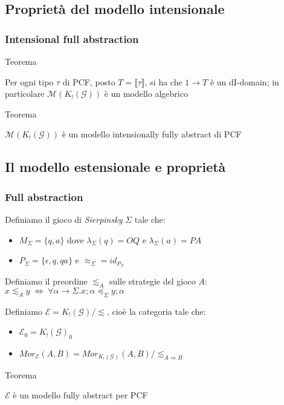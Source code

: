\documentclass{beamer}
\begin{document}
\subsection{Proprietà del modello intensionale}

\begin{frame}
	
	\frametitle{Intensional full abstraction}
	
	
	\begin{block}{Teorema}
		
		Per ogni tipo $\tau$ di PCF, posto $T= \llbracket \tau \rrbracket$, si ha che $1 \rightarrow T$ è un dI-domain;
		in particolare $\mathcal{M}(K_! (\mathcal{G}) )$ è un modello algebrico
		
	\end{block}
	
	
	\begin{block}{Teorema}
		
		$\mathcal{M}(K_! (\mathcal{G}) )$ è un modello intensionally fully abstract di PCF
		
	\end{block}
	
	
\end{frame}




\subsection{Il modello estensionale e proprietà}

\begin{frame}
	
	\frametitle{Full abstraction}
	
	Definiamo il gioco di \emph{Sierpinsky} $\Sigma$ tale che:
	\begin{itemize}
		\item $M_\Sigma = \{ q,a \}$ dove $\lambda_\Sigma (q)=OQ$ e $\lambda_\Sigma (a)=PA$
		\item $P_\Sigma = \{ \epsilon , q , qa \}$ e $\approx_\Sigma = id_{P_\Sigma}$
	\end{itemize}
	
	Definiamo il preordine $\lesssim_A$ sulle strategie del gioco $A$: $x \lesssim_A y \; \Leftrightarrow \; \forall \alpha \rightarrow \Sigma . x;\alpha \preccurlyeq_\Sigma y;\alpha$
	
	Definiamo $\mathcal{E} = K_!(\mathcal{G}) / \lesssim$, cioè la categoria tale che:
	\begin{itemize}
		\item $\mathcal{E}_0 = K_!(\mathcal{G})_0$
		\item $Mor_{\mathcal{E}}(A,B) = Mor_{K_!(\mathcal{G})}(A,B) / \lesssim_{A\Rightarrow B}$
	\end{itemize}

	
	\begin{block}{Teorema}
		
		$\mathcal{E}$ è un modello fully abstract per PCF
		
	\end{block}
	
\end{frame}
\end{document}
